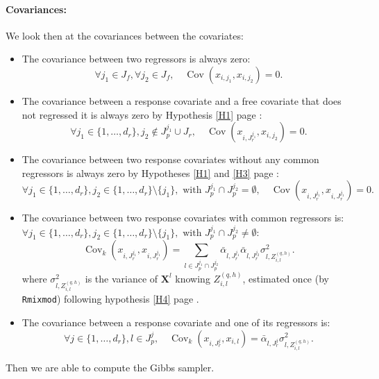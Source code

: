 \documentclass[12pt,a4paper]{report}
\begin{document}
\paragraph{Covariances:} We look then at the covariances between the covariates:
\begin{itemize}
	\item The covariance between two regressors is always zero:
	\begin{equation}
		\forall j_1 \in J_f, \forall j_2 \in J_f, \quad   \operatorname{Cov}(x_{i,j_1},x_{i,j_2})=0. \nonumber 
	\end{equation}
	\item The covariance between a response covariate and a free covariate that does not regressed it is always zero by Hypothesis \ref{H1} page \pageref{H1}:
	\begin{equation}
		\forall j_1 \in \{1,\dots,d_r \}, j_2 \notin J_p^{j_1}\cup J_r, \quad \operatorname{Cov}(x_{i,J_r^{j_1}},x_{i,j_2})=0. \nonumber 
	\end{equation}
	\item The covariance between two response covariates without any common regressors is always zero  by Hypotheses \ref{H1} and \ref{H3} page \pageref{H3}:
	\begin{equation}
		\forall j_1 \in \{1,\dots,d_r \}, j_2 \in \{1,\dots, d_r \}\setminus\{ j_1 \}, \textrm{ with } J_p^{j_1}\cap J_p^{j_2}= \emptyset, \quad \operatorname{Cov}(x_{i,J_r^{j_1}},x_{i,J_r^{j_1}})=0. \nonumber 
	\end{equation}
	\item The covariance between two response covariates with common regressors is:\\
	$\forall j_1 \in \{1,\dots,d_r \}, j_2 \in \{1,\dots, d_r \}\setminus\{ j_1 \}, \textrm{ with } J_p^{j_1}\cap J_p^{j_2}\neq \emptyset$:
	\begin{equation}
	  \operatorname{Cov}_k(x_{i,J_r^{j_1}},x_{i,J_r^{j_1}})=\sum_{l \in J_p^{j_1}\cap J_p^{j_2}}\bar{\alpha}_{l,J_r^{j_1}}\bar{\alpha}_{l,J_r^{j_2}}\sigma^2_{l,Z_{i,l}^{(q,h)}} . \nonumber 
	\end{equation}
	where $\sigma^2_{l,Z_{i,l}^{(q,h)}}$ is the variance of $\boldsymbol{X}^l$ knowing $Z_{i,l}^{(q,h)}$, estimated once (by {\tt Rmixmod}) following hypothesis \ref{H4} page \pageref{H4}.
	\item The covariance between a response covariate and one of its regressors is:
	\begin{equation}
		\forall j \in \{1,\dots, d_r\}, l \in J_p^{j}, \quad \operatorname{Cov}_k(x_{i,J_r^{j}},x_{i,l})=\bar{\alpha}_{l,J_r^{j}}\sigma^2_{l,Z_{i,l}^{(q,h)}} . \nonumber 
	\end{equation}
\end{itemize}
Then we are able to compute the Gibbs sampler.
\end{document}

